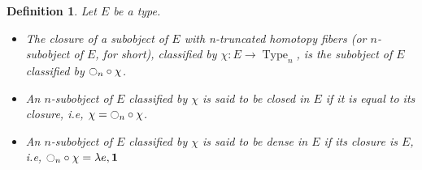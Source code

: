 \documentclass[preprint,9pt,numbers]{sigplanconf}
\newtheorem{defi}[thm]{Definition}
\newcommand{\ie}{i.e,\xspace}
\DeclareMathOperator{\Type}{Type}
\newcommand{\modal}{\ensuremath{\ocircle}}
\newcommand \one {\mathbf{1}}
\newenvironment{mymath}[1][-0em]{%
  \newcommand\mymathaux{\vspace{#1}}%
  \vspace{#1}%
  \begin{equation*}%
  }{ %
    \mymathaux%
  \end{equation*}}
\begin{document}
\begin{defi}
  Let $E$ be a type. 
  \begin{itemize}

  \item The {\em closure} of a subobject of $E$ with
  n-truncated homotopy fibers (or $n$-subobject of $E$, for short),
  classified by $\chi : E \to \Type_n$, is the subobject of $E$
  classified by $\modal_n \circ \chi$.

  
\item An $n$-subobject of $E$ classified by $\chi$ is said to be {\em
    closed in $E$} if it is equal to its closure, \ie
  $\chi = \modal_n \circ \chi$.

  
\item An $n$-subobject of $E$ classified by $\chi$ is said to be {\em
    dense in $E$} if its closure is $E$, \ie
  $\modal_n \circ \chi = \lambda e, \one$ 
  \end{itemize}
\end{defi}


\end{document}
